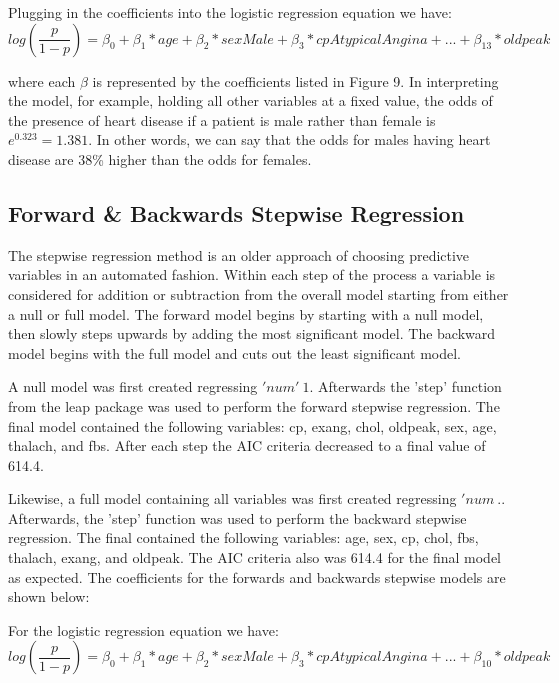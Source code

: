 \documentclass[12pt]{article}
\begin{document}
Plugging in the coefficients into the logistic regression equation we have: 
\[log(\frac{p}{1-p})=\beta_{0}+\beta_{1}*age+\beta_{2}*sexMale+\beta_{3}*cpAtypical Angina+...+\beta_{13}*oldpeak\]

where each $\beta$ is represented by the coefficients listed in Figure 9. In interpreting the model, for example, holding all other variables at a fixed value, the odds of the presence of heart disease if a patient is male rather than female is $e^{0.323}=1.381$. In other words, we can say that the odds for males having heart disease are 38\% higher than the odds for females. 

\pagebreak
\subsection{Forward \& Backwards Stepwise Regression}
The stepwise regression method is an older approach of choosing predictive variables in an automated fashion. Within each step of the process a variable is considered for addition or subtraction from the overall model starting from either a null or full model. The forward model begins by starting with a null model, then slowly steps upwards by adding the most significant model. The backward model begins with the full model and cuts out the least significant model. 

A null model was first created regressing $'num' ~ 1$. Afterwards the 'step' function from the leap package was used to perform the forward stepwise regression. The final model contained the following variables: cp, exang, chol, oldpeak, sex, age, thalach, and fbs. After each step the AIC criteria decreased to a final value of 614.4.

Likewise, a full model containing all variables was first created regressing $'num ~ .$. Afterwards, the 'step' function was used to perform the backward stepwise regression. The final contained the following variables: age, sex, cp, chol, fbs, thalach, exang, and oldpeak. The AIC criteria also was 614.4 for the final model as expected. 
The coefficients for the forwards and backwards stepwise models are shown below: 

For the logistic regression equation we have: 
\[log(\frac{p}{1-p})=\beta_{0}+\beta_{1}*age+\beta_{2}*sexMale+\beta_{3}*cpAtypical Angina+...+\beta_{10}*oldpeak\]
\end{document}
